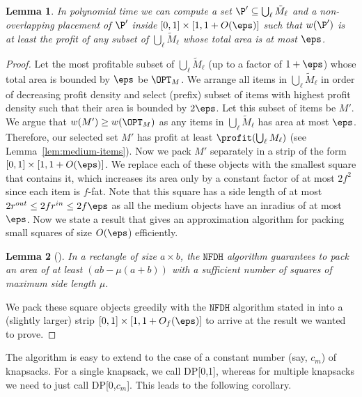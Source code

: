\documentclass[10pt,a4paper]{article}
\newtheorem{lemma}{Lemma}[section]
\theoremstyle{plain}
\theoremstyle{plain}
\theoremstyle{plain}
\theoremstyle{definition}
\def\rem#1{{\marginpar{\raggedright\scriptsize #1}}}
\newcommand{\awr}[1]{\rem{\textcolor{orange}{$\bullet$ #1}}}
\newcommand{\ari}[1]{#1}
\begin{document}
{%
%

\begin{lemma}
\label{lem:med}
In polynomial time we can compute a set $\P'\subseteq \bigcup_{\ell}\tilde{M}_{\ell}$
and a non-overlapping placement of $\P'$ inside $[0,1]\times[1,1+O(\eps)]$
such that $w(\P')$ is at least the profit of any subset of \ari{$\bigcup_{\ell}\tilde{M}_{\ell}$}
whose total area is at most $\eps$.
\end{lemma}

\begin{proof}
Let the most profitable subset of $\bigcup_{\ell} \tilde{M}_{\ell}$
(up to a factor of $1+\eps$) whose total area is bounded by $\eps$ be $\OPT_{M}$.
 We arrange all items in $\bigcup_{\ell}\tilde{M}_{\ell}$ in order of decreasing profit density and select (prefix) subset of items with highest profit density such that their area is bounded by $2\eps$. Let this subset of items be $M'$. We argue that $w(M')\ge w(\OPT_M)$ as any items in $\bigcup_{\ell} \tilde{M}_{\ell}$ has area at most $\eps$.
 Therefore, our selected set $M'$ has profit at least $\profit(\bigcup_{\ell}M_{\ell})$
(see Lemma~\ref{lem:medium-items}).
Now we pack  $M'$ 
separately in a strip of the form $[0,1]\times[1,1+O(\eps)]$.
We replace each
of these objects with the smallest square that contains it, which
increases its area only by a constant factor of at most {$2f^2$ since each item is $f$-fat. Note that this square has a side length of at most $2r^{out} \le 2f r^{in} \le 2f\eps$ as all the medium objects have an inradius of at most $\eps$. Now we state a result that gives an approximation algorithm for packing small squares of size $O(\eps$) efficiently.}
\begin{lemma}[\cite{NFDH}]\label{lem:nfdh}
	In a rectangle of size $a \times b$, the $\mathtt{NFDH}$ algorithm guarantees to pack an area of at least $(ab-\mu(a+b))$ with a sufficient number of squares of maximum side length $\mu$.
\end{lemma}

We pack these square objects greedily with the $\mathtt{NFDH}$ algorithm
\cite{NFDH} stated in  into a (slightly larger) strip $[0,1]\times[1,1+O_f(\eps)]$ to arrive at the result we wanted to prove.
\end{proof}
The algorithm is easy to extend to the case of a constant number (say, $c_m$) of knapsacks. For a single knapsack, we call DP[0,1], whereas for multiple knapsacks we need to just call DP[0,$c_m$]. This leads to the following corollary. 

}
\end{document}
